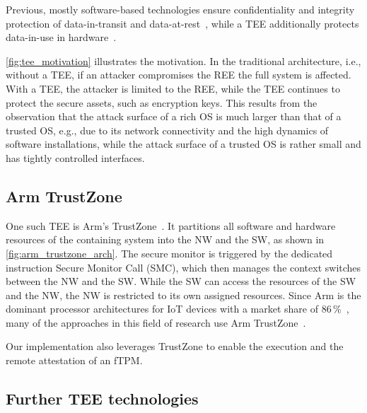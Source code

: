 
Previous, mostly software-based technologies ensure confidentiality and integrity protection of data-in-transit and data-at-rest~\cite{Pecholt2022}, while a \ac{TEE} additionally protects data-in-use in hardware~\cite{Pecholt2022, Lee:EECS-2022-96}.


\autoref{fig:tee_motivation} illustrates the motivation. In the traditional architecture, i.e., without a TEE, if an attacker compromises the \ac{REE} the full system is affected. With a \ac{TEE}, the attacker is limited to the \ac{REE}, while the \ac{TEE} continues to protect the secure assets, such as encryption keys. This results from the observation that the attack surface of a rich OS is much larger than that of a trusted OS, e.g., due to its network connectivity and the high dynamics of software installations, while the attack surface of a trusted OS is rather small and has tightly controlled interfaces.



\subsection{Arm TrustZone}

One such \ac{TEE} is Arm's TrustZone~\cite{ARM09, Ngabonziza2016}. It partitions all software and hardware resources of the containing system into the \ac{NW} and the \ac{SW}, as shown in \autoref{fig:arm_trustzone_arch}. The secure monitor is triggered by the dedicated instruction Secure Monitor Call (SMC), which then manages the context switches between the \ac{NW} and the \ac{SW}.
While the \ac{SW} can access the resources of the \ac{SW} and the \ac{NW}, the \ac{NW} is restricted to its own assigned resources.
Since Arm is the dominant processor architectures for IoT devices with a market share of 86\,\%~\cite{eclipse}, many of the approaches in this field of research use Arm TrustZone~\cite{Valadares2021}.



Our implementation also leverages TrustZone to enable the execution and the remote attestation of an fTPM\@.

\subsection{Further TEE technologies}

